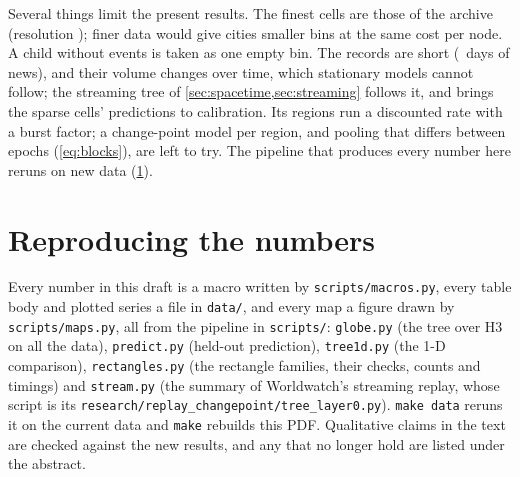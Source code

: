 \documentclass[11pt,a4paper]{article}
\begin{document}
Several things limit the present results. The finest cells are those of the archive (resolution
\finestRes); finer data would give cities smaller bins at the same cost per node. A child without
events is taken as one empty bin. The records are short (\newsDays\ days of news), and their volume
changes over time, which stationary models cannot follow; the streaming tree of
\cref{sec:spacetime,sec:streaming} follows it, and brings the sparse cells' predictions to
calibration. Its regions run a discounted rate with a burst factor; a change-point model per
region, and pooling that differs between epochs (\cref{eq:blocks}), are left to try. The pipeline that produces every number here reruns on new data
(\cref{app:repro}).




\appendix
\section{Reproducing the numbers}\label{app:repro}

Every number in this draft is a macro written by \texttt{scripts/macros.py}, every table body and
plotted series a file in \texttt{data/}, and every map a figure drawn by \texttt{scripts/maps.py},
all from the pipeline in \texttt{scripts/}: \texttt{globe.py} (the tree over H3 on all the data),
\texttt{predict.py} (held-out prediction), \texttt{tree1d.py} (the 1-D comparison),
\texttt{rectangles.py} (the rectangle families, their checks, counts and timings) and
\texttt{stream.py} (the summary of Worldwatch's streaming replay, whose script is its
\texttt{research/replay\_changepoint/tree\_layer0.py}). \texttt{make data}
reruns it on the current data and \texttt{make} rebuilds this PDF. Qualitative claims in the text
are checked against the new results, and any that no longer hold are listed under the abstract.
\end{document}

